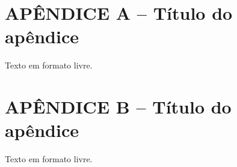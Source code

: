 


\chapter*{APÊNDICE A -- Título do apêndice}\label{apendiceA}


Texto em formato livre.




\chapter*{APÊNDICE B -- Título do apêndice}\label{apendiceB}



Texto em formato livre.

